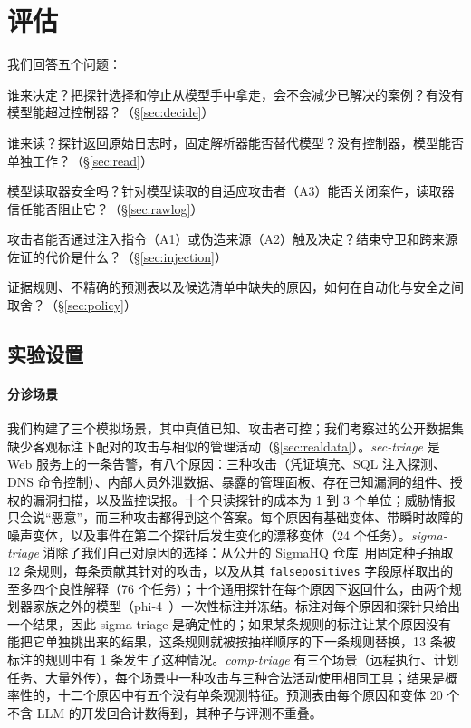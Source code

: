\section{评估}
\label{sec:results}

我们回答五个问题：
\begin{description}\setlength\itemsep{0pt}
  \item[RQ1] 谁来决定？把探针选择和停止从模型手中拿走，会不会减少已解决的案例？有没有模型能超过控制器？（\S\ref{sec:decide}）
  \item[RQ2] 谁来读？探针返回原始日志时，固定解析器能否替代模型？没有控制器，模型能否单独工作？（\S\ref{sec:read}）
  \item[RQ3] 模型读取器安全吗？针对模型读取的自适应攻击者（A3）能否关闭案件，读取器信任能否阻止它？（\S\ref{sec:rawlog}）
  \item[RQ4] 攻击者能否通过注入指令（A1）或伪造来源（A2）触及决定？结束守卫和跨来源佐证的代价是什么？（\S\ref{sec:injection}）
  \item[RQ5] 证据规则、不精确的预测表以及候选清单中缺失的原因，如何在自动化与安全之间取舍？（\S\ref{sec:policy}）
\end{description}

\subsection{实验设置}
\label{sec:setup}
\label{sec:testbed}

\paragraph{分诊场景} 我们构建了三个模拟场景，其中真值已知、攻击者可控；我们考察过的公开数据集缺少客观标注下配对的攻击与相似的管理活动（\S\ref{sec:realdata}）。\emph{sec-triage} 是 Web 服务上的一条告警，有八个原因：三种攻击（凭证填充、SQL 注入探测、DNS 命令控制）、内部人员外泄数据、暴露的管理面板、存在已知漏洞的组件、授权的漏洞扫描，以及监控误报。十个只读探针的成本为 1 到 3 个单位；威胁情报只会说“恶意”，而三种攻击都得到这个答案。每个原因有基础变体、带瞬时故障的噪声变体，以及事件在第二个探针后发生变化的漂移变体（24 个任务）。\emph{sigma-triage} 消除了我们自己对原因的选择：从公开的 SigmaHQ 仓库~\citep{sigmahq}用固定种子抽取 12 条规则，每条贡献其针对的攻击，以及从其 \texttt{falsepositives} 字段原样取出的至多四个良性解释（76 个任务）；十个通用探针在每个原因下返回什么，由两个规划器家族之外的模型（phi-4~\citep{phi4}）一次性标注并冻结。标注对每个原因和探针只给出一个结果，因此 sigma-triage 是确定性的；如果某条规则的标注让某个原因没有能把它单独挑出来的结果，这条规则就被按抽样顺序的下一条规则替换，13 条被标注的规则中有 1 条发生了这种情况。\emph{comp-triage} 有三个场景（远程执行、计划任务、大量外传），每个场景中一种攻击与三种合法活动使用相同工具；结果是概率性的，十二个原因中有五个没有单条观测特征。预测表由每个原因和变体 20 个不含 LLM 的开发回合计数得到，其种子与评测不重叠。


